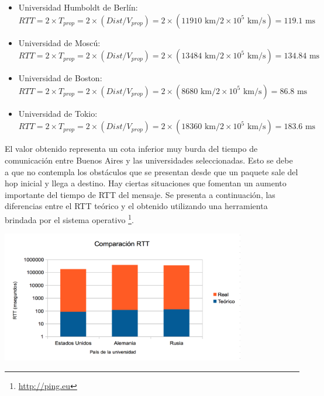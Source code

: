 \begin{itemize}
 \item Universidad Humboldt de Berlín:
\begin{equation}
 	RTT = 2 \times T_{prop} = 2 \times (Dist / V_{prop}) = 2 \times (11910 \text{ km} / 2\times10^5 \text{ km/s}) = 119.1  \text{ ms}
\end{equation}

 \item Universidad de Moscú:
 \begin{equation}
 	RTT = 2 \times T_{prop} = 2 \times (Dist / V_{prop}) = 2 \times (13484 \text{ km} / 2\times10^5 \text{ km/s}) = 134.84 \text{ ms}
 \end{equation}

 \item Universidad de Boston:
 \begin{equation}
 	RTT = 2 \times T_{prop} = 2 \times (Dist / V_{prop}) = 2 \times (8680 \text{ km} / 2\times10^5 \text{ km/s}) = 86.8 \text{ ms}
 \end{equation}

 \item Universidad de Tokio:
 \begin{equation}
 	RTT = 2 \times T_{prop} = 2 \times (Dist / V_{prop}) = 2 \times (18360  \text{ km} / 2\times10^5 \text{ km/s}) = 183.6 \text{ ms}
 \end{equation}

\end{itemize}

El valor obtenido representa un cota inferior muy burda del tiempo de comunicación entre Buenos Aires y las universidades seleccionadas. Esto se debe a que no contempla los obstáculos que se presentan desde que un paquete sale del hop inicial y llega a destino. Hay ciertas situaciones que fomentan un aumento importante del tiempo de RTT del mensaje. Se presenta a continuación, las diferencias entre el RTT teórico y el obtenido utilizando una herramienta brindada por el sistema operativo \footnote{\url{http://ping.eu}{}}.

\centerline{\includegraphics[width=0.8\textwidth]{imagenes/1Parte-comparacionRTT}}

